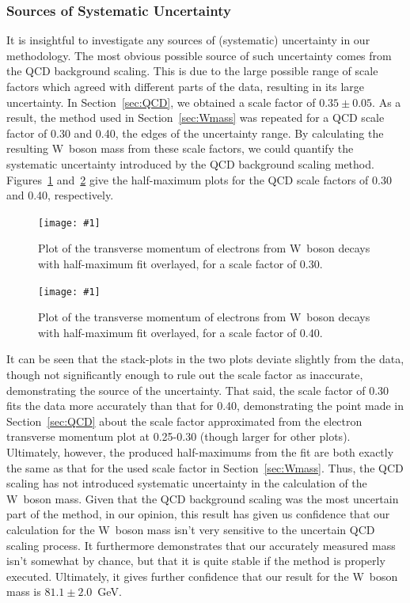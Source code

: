 \documentclass[twocolumn]{article}
\newcommand{\insertFigure}[1]{%
   \texttt{[image: \#1]}%
}
\begin{document}
\subsubsection{Sources of Systematic Uncertainty}
It is insightful to investigate any sources of (systematic) uncertainty in our methodology. The most obvious possible source of such uncertainty comes from the QCD background scaling. This is due to the large possible range of scale factors which agreed with different parts of the data, resulting in its large uncertainty. In Section~\ref{sec:QCD}, we obtained a scale factor of $0.35 \pm 0.05$. As a result, the method used in Section~\ref{sec:Wmass} was repeated for a QCD scale factor of 0.30 and 0.40, the edges of the uncertainty range. By calculating the resulting W~boson mass from these scale factors, we could quantify the systematic uncertainty introduced by the QCD background scaling method. Figures~\ref{fig:W1} and~\ref{fig:W2} give the half-maximum plots for the QCD scale factors of 0.30 and 0.40, respectively. 
\begin{figure}[!h]
	\centering
	\insertFigure{Images/Wmass_30Labeled.png}
	\caption{Plot of the transverse momentum of electrons from W~boson decays with half-maximum fit overlayed, for a scale factor of 0.30.}
	\label{fig:W1}
\end{figure}
\begin{figure}[!h]
	\centering
	\insertFigure{Images/Wmass_40Labeled.png}
	\caption{Plot of the transverse momentum of electrons from W~boson decays with half-maximum fit overlayed, for a scale factor of 0.40.}
	\label{fig:W2}
\end{figure}
It can be seen that the stack-plots in the two plots deviate slightly from the data, though not significantly enough to rule out the scale factor as inaccurate, demonstrating the source of the uncertainty. That said, the scale factor of 0.30 fits the data more accurately than that for 0.40, demonstrating the point made in Section~\ref{sec:QCD} about the scale factor approximated from the electron transverse momentum plot at 0.25-0.30 (though larger for other plots). Ultimately, however, the produced half-maximums from the fit are both exactly the same as that for the used scale factor in Section~\ref{sec:Wmass}. Thus, the QCD scaling has not introduced systematic uncertainty in the calculation of the W~boson mass. Given that the QCD background scaling was the most uncertain part of the method, in our opinion, this result has given us confidence that our calculation for the W~boson mass isn't very sensitive to the uncertain QCD scaling process. It furthermore demonstrates that our accurately measured mass isn't somewhat by chance, but that it is quite stable if the method is properly executed. Ultimately, it gives further confidence that our result for the W~boson mass is $81.1 \pm 2.0$~GeV.
\end{document}

